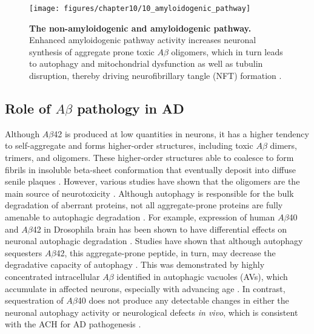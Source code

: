 \begin{figure}[!htbp]
  \center
  \texttt{[image: figures/chapter10/10\_amyloidogenic\_pathway]}
  \caption[The non-amyloidogenic and amyloidogenic pathway.]{\textbf{The non-amyloidogenic and amyloidogenic pathway.} Enhanced amyloidogenic pathway activity increases neuronal synthesis of aggregate prone toxic $A\beta$ oligomers, which in turn leads to autophagy and mitochondrial dysfunction as well as tubulin disruption, thereby driving neurofibrillary tangle (NFT) formation \citep{Ntsapi2018}.}
  \label{fig:10_amyloidogenic_pathway}
\end{figure}

\subsection{Role of $A\beta$ pathology in AD}
Although $A\beta$42 is produced at low quantities in neurons, it has a higher tendency to self-aggregate and forms higher-order structures, including toxic $A\beta$ dimers, trimers, and oligomers. These higher-order structures able to coalesce to form fibrils in insoluble beta-sheet conformation that eventually deposit into diffuse senile plaques \citep{Burdick1992,Gravina1995}. However, various studies have shown that the oligomers are the main source of neurotoxicity \citep{Shankar2008,Shankar2009}. Although autophagy is responsible for the bulk degradation of aberrant proteins, not all aggregate-prone proteins are fully amenable to autophagic degradation \citep{Wong2008}. For example, expression of human $A\beta$40 and $A\beta$42 in Drosophila brain has been shown to have differential effects on neuronal autophagic degradation \citep{Ling2009}. Studies have shown that although autophagy sequesters $A\beta$42, this aggregate-prone peptide, in turn, may decrease the degradative capacity of autophagy \citep{Ling2014,Ling2011}. This was demonstrated by highly concentrated intracellular $A\beta$ identified in autophagic vacuoles (AVs), which accumulate in affected neurons, especially with advancing age \citep{Ling2011}. In contrast, sequestration of $A\beta$40 does not produce any detectable changes in either the neuronal autophagy activity or neurological defects \textit{in vivo}, which is consistent with the ACH for AD pathogenesis \citep{Hardy1992}.

